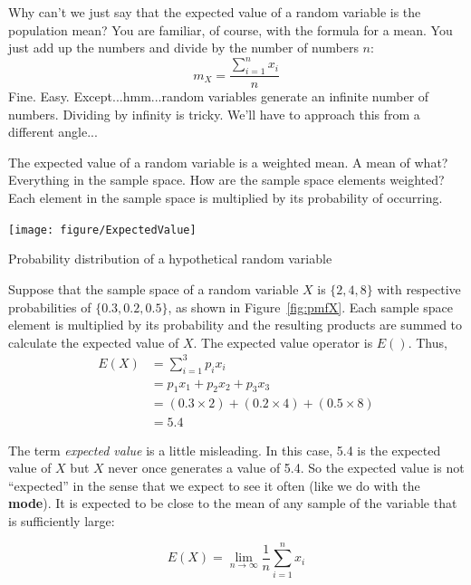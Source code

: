 \documentclass[nohyper,justified,marginals=raggedright]{tufte-book}\usepackage[]{graphicx}\usepackage[]{color}
\newenvironment{knitrout}{}{} %
\newcommand{\defword}[1]{\textbf{#1}}
\begin{document}
Why can't we just say that the expected value of a random variable is the population mean? You are familiar, of course, with the formula for a mean. You just add up the numbers and divide by the number of numbers $n$:
\begin{equation*}
m_X=\frac{\sum_{i=1}^{n} {x_i}}{n}
\end{equation*}
Fine. Easy. Except...hmm...random variables generate an infinite number of numbers. Dividing by infinity is tricky. We'll have to approach this from a different angle...

The expected value of a random variable is a weighted mean. A mean of what? Everything in the sample space. How are the sample space elements weighted? Each element in the sample space is multiplied by its probability of occurring.

\begin{marginfigure}
\centering
\begin{knitrout}
\color{fgcolor}
\texttt{[image: figure/ExpectedValue]} 

\end{knitrout}
\caption{Probability distribution of a hypothetical random variable}
\label{fig:pmfX}
\end{marginfigure}

Suppose that the sample space of a random variable $X$ is $\{2, 4, 8\}$ with respective probabilities of $\{0.3, 0.2, 0.5\}$, as shown in Figure~\ref{fig:pmfX}. Each sample space element is multiplied by its probability and the resulting products are summed to calculate the expected value of $X$. The expected value operator is $E()$. Thus,
\begin{align*}
E(X)&=\sum_{i=1}^{3}{p_i x_i}\\
&= p_1x_1+p_2x_2+p_3x_3\\
&= (0.3\times 2)+(0.2\times 4)+(0.5\times 8)\\
&=5.4
\end{align*}

The term \emph{expected value} is a little misleading. In this case, 5.4 is the expected value of $X$ but $X$ never once generates a value of 5.4. So the expected value is not ``expected'' in the sense that we expect to see it often (like we do with the \defword{mode}). It is expected to be close to the mean of any sample of the variable that is sufficiently large:

\begin{equation*}
E(X)=\lim_{n \to \infty} \frac{1}{n}\sum_{i=1}^{n} {x_i}
\end{equation*}
\end{document}

